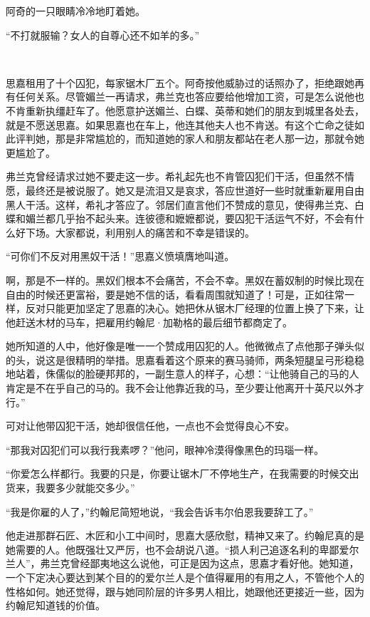 \par 阿奇的一只眼睛冷冷地盯着她。
\par “不打就服输？女人的自尊心还不如羊的多。”
\par  
\par 思嘉租用了十个囚犯，每家锯木厂五个。阿奇按他威胁过的话照办了，拒绝跟她再有任何关系。尽管媚兰一再请求，弗兰克也答应要给他增加工资，可是怎么说他也不肯重新执缰赶车了。他愿意护送媚兰、白蝶、英蒂和她们的朋友到城里各处去，就是不愿送思嘉。如果思嘉也在车上，他连其他夫人也不肯送。有这个亡命之徒如此评判她，那是非常尴尬的，而知道她的家人和朋友都站在老人那一边，那就令她更尴尬了。
\par 弗兰克曾经请求过她不要走这一步。希礼起先也不肯管囚犯们干活，但虽然不情愿，最终还是被说服了。她又是流泪又是哀求，答应世道好一些时就重新雇用自由黑人干活。这样，希礼才答应了。邻居们直言他们不赞成的意见，使得弗兰克、白蝶和媚兰都几乎抬不起头来。连彼德和嬷嬷都说，要囚犯干活运气不好，不会有什么好下场。大家都说，利用别人的痛苦和不幸是错误的。
\par “可你们不反对用黑奴干活！”思嘉义愤填膺地叫道。
\par 啊，那是不一样的。黑奴们根本不会痛苦，不会不幸。黑奴在蓄奴制的时候比现在自由的时候还更富裕，要是她不信的话，看看周围就知道了！可是，正如往常一样，反对只能更加坚定了思嘉的决心。她把休从锯木厂经理的位置上换了下来，让他赶送木材的马车，把雇用约翰尼·加勒格的最后细节都商定了。
\par 她所知道的人中，他好像是唯一一个赞成用囚犯的人。他微微点了点他那子弹头似的头，说这是很精明的举措。思嘉看着这个原来的赛马骑师，两条短腿呈弓形稳稳地站着，侏儒似的脸硬邦邦的，一副生意人的样子，心想：“让他骑自己的马的人肯定是不在乎自己的马的。我不会让他靠近我的马，至少要让他离开十英尺以外才行。”
\par 可对让他带囚犯干活，她却很信任他，一点也不会觉得良心不安。
\par “那我对囚犯们可以我行我素啰？”他问，眼神冷漠得像黑色的玛瑙一样。
\par “你爱怎么样都行。我要的只是，你要让锯木厂不停地生产，在我需要的时候交出货来，我要多少就能交多少。”
\par “我是你雇的人了，”约翰尼简短地说，“我会告诉韦尔伯恩我要辞工了。”
\par 他走进那群石匠、木匠和小工中间时，思嘉大感欣慰，精神又来了。约翰尼真的是她需要的人。他既强壮又严厉，也不会胡说八道。“损人利己追逐名利的卑鄙爱尔兰人”，弗兰克曾经鄙夷地这么说他，可正是因为这点，思嘉才看好他。她知道，一个下定决心要达到某个目的的爱尔兰人是个值得雇用的有用之人，不管他个人的性格如何。她还觉得，跟与她同阶层的许多男人相比，她跟他还更接近一些，因为约翰尼知道钱的价值。
